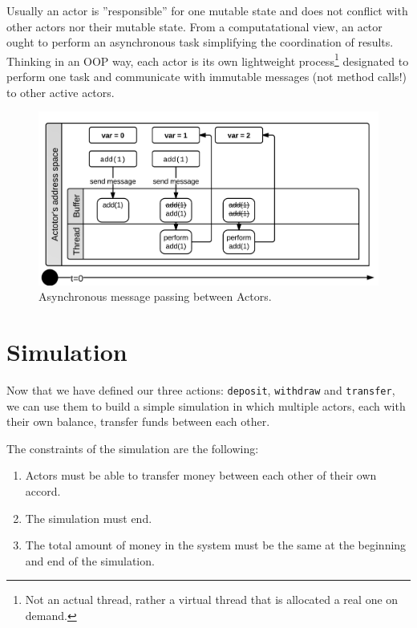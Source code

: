 \documentclass[a4paper,12pt]{kth-mag}
\begin{document}
Usually an actor is ''responsible'' for one mutable state and does not conflict with other actors nor their mutable state. From a computatational view, an actor ought to perform an asynchronous task simplifying the coordination of results. Thinking in an OOP way, each actor is its own lightweight process\footnote{Not an actual thread, rather a virtual thread that is allocated a real one on demand.} designated to perform one task and communicate with immutable messages (not method calls!) to other active actors.

\begin{figure}[H]
    \begin{center}
    \includegraphics{images/ActorsAdd.png}
    \end{center}
    \caption{Asynchronous message passing between Actors.}
    \label{fig:actorsAdd}
\end{figure}

\section{Simulation}

Now that we have defined our three actions: \texttt{deposit}, \texttt{withdraw} and \texttt{transfer}, we can use them to build a simple simulation in which multiple actors, each with their own balance, transfer funds between each other. 

The constraints of the simulation are the following:

\begin{enumerate}
\item Actors must be able to transfer money between each other of their own accord.
\item The simulation must end.
\item The total amount of money in the system must be the same at the beginning and end of the simulation.
\end{enumerate}
\end{document}
